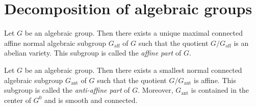 \section{Decomposition of algebraic groups}

    \begin{theorem}\label{thm:Chavellaye_decomposition}
        Let \(G\) be an algebraic group.
        Then there exists a unique maximal connected affine normal algebraic subgroup \(G_{\text{aff}}\) of \(G\) such that the quotient \(G/G_{\text{aff}}\) is an abelian variety.
        This subgroup is called the \emph{affine part} of \(G\).
    \end{theorem}

    \begin{theorem}\label{thm:Rosenlicht_decomposition}
        Let \(G\) be an algebraic group.
        Then there exists a smallest normal connected algebraic subgroup \(G_{\text{ant}}\) of \(G\) such that the quotient \(G/G_{\text{ant}}\) is affine.
        This subgroup is called the \emph{anti-affine part} of \(G\).
        Moreover, \(G_{\text{ant}}\) is contained in the center of \(G^0\) and is smooth and connected.
    \end{theorem}

\subsection{}
